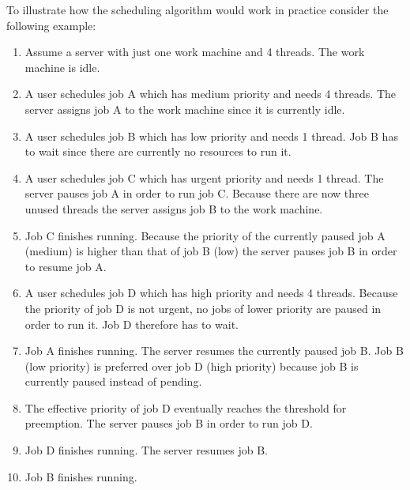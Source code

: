 To illustrate how the scheduling algorithm would work in practice consider the following example:
\begin{enumerate}
  \item Assume a server with just one work machine and 4 threads.
  The work machine is idle.
  \item A user schedules job A which has medium priority and needs 4 threads.
  The server assigns job A to the work machine since it is currently idle.
  \item A user schedules job B which has low priority and needs 1 thread.
  Job B has to wait since there are currently no resources to run it.
  \item A user schedules job C which has urgent priority and needs 1 thread.
  The server pauses job A in order to run job C.
  Because there are now three unused threads the server assigns job B to the work machine.
  \item Job C finishes running.
  Because the priority of the currently paused job A (medium) is higher than that of job B (low) the server pauses job B in order to resume job A.
  \item A user schedules job D which has high priority and needs 4 threads.
  Because the priority of job D is not urgent, no jobs of lower priority are paused in order to run it.
  Job D therefore has to wait.
  \item Job A finishes running.
  The server resumes the currently paused job B.
  Job B (low priority) is preferred over job D (high priority) because job B is currently paused instead of pending.
  \item The effective priority of job D eventually reaches the threshold for preemption.
  The server pauses job B in order to run job D.
  \item Job D finishes running.
  The server resumes job B.
  \item Job B finishes running.
\end{enumerate}

